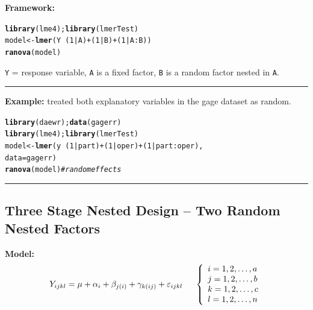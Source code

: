 \documentclass[12pt,english]{article}\usepackage[]{graphicx}\usepackage[table]{xcolor}
\makeatletter
\newcommand{\hlnum}[1]{\textcolor[rgb]{0.686,0.059,0.569}{#1}}%
\newcommand{\hlcom}[1]{\textcolor[rgb]{0.678,0.584,0.686}{\textit{#1}}}%
\newcommand{\hlopt}[1]{\textcolor[rgb]{0,0,0}{#1}}%
\newcommand{\hldef}[1]{\textcolor[rgb]{0.345,0.345,0.345}{#1}}%
\newcommand{\hlkwb}[1]{\textcolor[rgb]{0.69,0.353,0.396}{#1}}%
\newcommand{\hlkwc}[1]{\textcolor[rgb]{0.333,0.667,0.333}{#1}}%
\newcommand{\hlkwd}[1]{\textcolor[rgb]{0.737,0.353,0.396}{\textbf{#1}}}%
\newenvironment{kframe}{%
 \def\at@end@of@kframe{}%
 \ifinner\ifhmode%
  \def\at@end@of@kframe{\end{minipage}}%
  \begin{minipage}{\columnwidth}%
 \fi\fi%
 \def\FrameCommand##1{\hskip\@totalleftmargin \hskip-\fboxsep
 \colorbox{shadecolor}{##1}\hskip-\fboxsep
     \hskip-\linewidth \hskip-\@totalleftmargin \hskip\columnwidth}%
 \MakeFramed {\advance\hsize-\width
   \@totalleftmargin\z@ \linewidth\hsize
   \@setminipage}}%
 {\par\unskip\endMakeFramed%
 \at@end@of@kframe}
\newenvironment{knitrout}{}{} %
\makeatother
\begin{document}
\begin{tcolorbox}[colback=yellow!50!red!25!white,colbacktitle=yellow!50!red,colframe=black!75!white,title=\textbf{R:} NSE - Both Factors Random]
\textbf{Framework:}\\
\vspace{-.2in}
\begin{knitrout}
\color{fgcolor}\begin{kframe}
\begin{alltt}
\hlkwd{library}\hldef{(lme4);} \hlkwd{library}\hldef{(lmerTest)}
\hldef{model} \hlkwb{<-} \hlkwd{lmer}\hldef{(Y} \hlopt{~} \hldef{(}\hlnum{1}\hlopt{|}\hldef{A)} \hlopt{+} \hldef{(}\hlnum{1}\hlopt{|}\hldef{B)} \hlopt{+} \hldef{(}\hlnum{1}\hlopt{|}\hldef{A}\hlopt{:}\hldef{B))}
\hlkwd{ranova}\hldef{(model)}
\end{alltt}
\end{kframe}
\end{knitrout}
\texttt{Y} = response variable, \texttt{A} is a fixed factor, \texttt{B} is a random factor nested in \texttt{A}.
\vspace{0.1in}
\par\noindent\rule{.9\textwidth}{0.4pt}

\textbf{Example:} \citet[][pgs 156-159]{lawson} treated both explanatory variables in the gage dataset as random.

\begin{knitrout}
\color{fgcolor}\begin{kframe}
\begin{alltt}
\hlkwd{library}\hldef{(daewr);} \hlkwd{data}\hldef{(gagerr)}
\hlkwd{library}\hldef{(lme4);} \hlkwd{library}\hldef{(lmerTest)}
\hldef{model} \hlkwb{<-} \hlkwd{lmer}\hldef{(y} \hlopt{~} \hldef{(}\hlnum{1}\hlopt{|}\hldef{part)} \hlopt{+} \hldef{(}\hlnum{1}\hlopt{|}\hldef{oper)} \hlopt{+} \hldef{(}\hlnum{1}\hlopt{|}\hldef{part}\hlopt{:}\hldef{oper),}
              \hlkwc{data} \hldef{= gagerr)}
\hlkwd{ranova}\hldef{(model)} \hlcom{# random effects}
\end{alltt}
\end{kframe}
\end{knitrout}
\end{tcolorbox}
\par\noindent\rule{.9\textwidth}{0.4pt}

\subsection{Three Stage Nested Design -- Two Random Nested Factors}
\textbf{Model:} \[Y_{ijkl} = \mu + \alpha_i + \beta_{j(i)} +\gamma_{k(ij)} + \varepsilon_{ijkl} \hspace{0.2in} \left\{
                \begin{array}{ll}
                  i = 1,2,\dots,a\\
                  j = 1,2,\dots,b\\
                  k = 1,2,\dots,c\\
                  l = 1,2,\dots,n\\
                  \end{array}
              \right.\]
\end{document}
